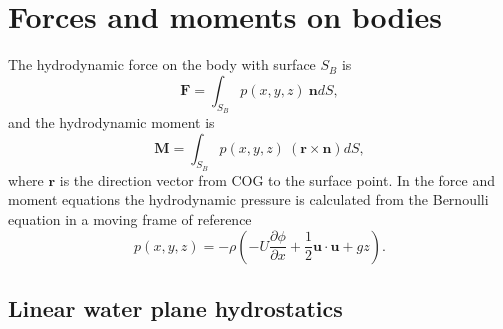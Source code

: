 \documentclass[]{book}
\newcommand{\V}[1]{\boldsymbol{#1}}
\newcommand{\D}[2]{\frac{\partial #1}{\partial #2}}
\begin{document}
\section{Forces and moments on bodies}
The hydrodynamic force on the body with surface $S_B$ is
\begin{equation}
	\V{F} = \int_{S_B} p(x, y, z) ~\V{n} dS, 
\end{equation}
and the hydrodynamic moment is
\begin{equation}
\V{M} = \int_{S_B} p(x, y, z) ~ (\V{r} \times \V{n}) dS,
\end{equation}
where $\V{r}$ is the direction vector from COG to the surface point. In the force and moment equations the hydrodynamic pressure is calculated from the Bernoulli equation in a moving frame of reference
\begin{equation}
	p(x, y, z) = -\rho \left( -U \D{\phi}{x} + \frac{1}{2} \V{u} \cdot \V{u} + gz \right).
\end{equation}

\subsection{Linear water plane hydrostatics}
\end{document}

